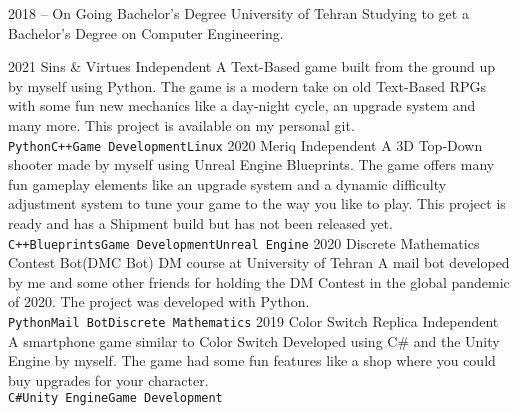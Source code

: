 \documentclass[9pt]{developercv} %
\begin{document}

\begin{entrylist}
	\entry
		{2018 -- On Going}
		{Bachelor's Degree}
		{University of Tehran}
		{Studying to get a Bachelor's Degree on Computer Engineering.}
\end{entrylist}



\begin{entrylist}
	\entry
		{2021}
		{Sins \& Virtues}
		{Independent}
		{A Text-Based game built from the ground up by myself using Python. The game is a modern take on old Text-Based RPGs with some fun new mechanics like a day-night cycle, an upgrade system and many more. This project is available on my personal git.\\ \texttt{Python}\slashsep\texttt{C++}\slashsep\texttt{Game Development}\slashsep\texttt{Linux}}
	\entry
		{2020}
		{Meriq}
		{Independent}
		{A 3D Top-Down shooter made by myself using Unreal Engine Blueprints. The game offers many fun gameplay elements like an upgrade system and a dynamic difficulty adjustment system to tune your game to the way you like to play. This project is ready and has a Shipment build but has not been released yet.\\ \texttt{C++}\slashsep\texttt{Blueprints}\slashsep\texttt{Game Development}\slashsep\texttt{Unreal Engine}}
	\entry
		{2020}
		{Discrete Mathematics Contest Bot(DMC Bot)}
		{DM course at University of Tehran}
		{A mail bot developed by me and some other friends for holding the DM Contest in the global pandemic of 2020. The project was developed with Python.\\ \texttt{Python}\slashsep\texttt{Mail Bot}\slashsep\texttt{Discrete Mathematics}}
	\entry
		{2019}
		{Color Switch Replica}
		{Independent}
		{A smartphone game similar to Color Switch Developed using C\# and the Unity Engine by myself. The game had some fun features like a shop where you could buy upgrades for your character.\\ \texttt{C\#}\slashsep\texttt{Unity Engine}\slashsep\texttt{Game Development}}
\end{entrylist}

\end{document}
